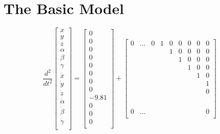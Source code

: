 \section*{The Basic Model}
\begin{equation*}
    \frac{d^{2}}{dt^{2}}
    \begin{bmatrix}
        x\\
        y\\
        z\\
        \alpha\\
        \beta\\
        \gamma\\
        \dot{x}\\
        \dot{y}\\
        \dot{z}\\
        \dot{\alpha}\\
        \dot{\beta}\\
        \dot{\gamma}\\
    \end{bmatrix}
    =
    \begin{bmatrix}
        0\\
        0\\
        0\\
        0\\
        0\\
        0\\
        0\\
        0\\
        -9.81\\
        0\\
        0\\
        0\\
    \end{bmatrix}
    +
    \begin{bmatrix}
        0&\dots&0&1&0&0&0&0&0\\
        &&&&1&0&0&0&0\\
        &&&&&1&0&0&0\\
        &&&&&&1&0&0\\
        &&&&&&&1&0\\
        &&&&&&&&1\\
        &&&&&&&&0\\
        &&&&&&&&\\
        &&&&&&&&\\
        &&&&&&&&\\
        &&&&&&&&\\
        0&\dots&&&&&&&0\\

\end{bmatrix}
\end{equation*}
